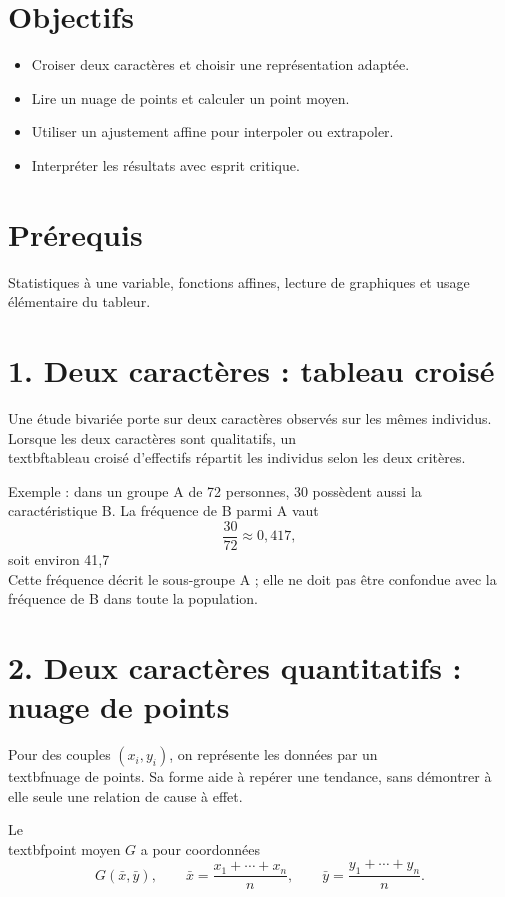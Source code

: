 \section{Objectifs}
\begin{itemize}
\item Croiser deux caractères et choisir une représentation adaptée.
\item Lire un nuage de points et calculer un point moyen.
\item Utiliser un ajustement affine pour interpoler ou extrapoler.
\item Interpréter les résultats avec esprit critique.
\end{itemize}

\section{Prérequis}
Statistiques à une variable, fonctions affines, lecture de graphiques et usage élémentaire du tableur.

\section{1. Deux caractères : tableau croisé}
Une étude bivariée porte sur deux caractères observés sur les mêmes individus. Lorsque les deux caractères sont qualitatifs, un \\textbf{tableau croisé d'effectifs} répartit les individus selon les deux critères.

Exemple : dans un groupe A de 72 personnes, 30 possèdent aussi la caractéristique B. La fréquence de B parmi A vaut
\[
\frac{30}{72}\approx 0{,}417,
\]
soit environ 41,7 \\%

Cette fréquence décrit le sous-groupe A ; elle ne doit pas être confondue avec la fréquence de B dans toute la population.

\section{2. Deux caractères quantitatifs : nuage de points}
Pour des couples $(x_i,y_i)$, on représente les données par un \\textbf{nuage de points}. Sa forme aide à repérer une tendance, sans démontrer à elle seule une relation de cause à effet.

Le \\textbf{point moyen} $G$ a pour coordonnées
\[
G(\bar x,\bar y),\qquad
\bar x=\frac{x_1+\cdots+x_n}{n},\qquad
\bar y=\frac{y_1+\cdots+y_n}{n}.
\]

